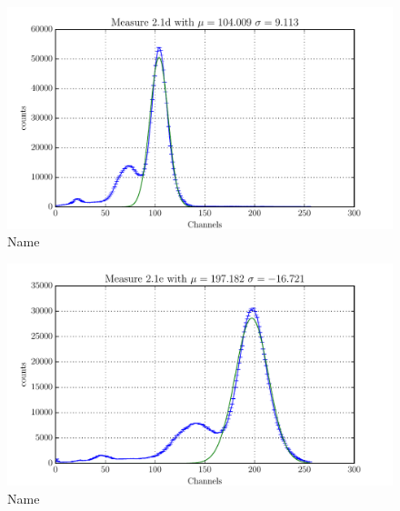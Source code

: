 \begin{figure}[htpb]
    \centering
    \includegraphics[width=0.8\linewidth]{analysis/figures/plot2_1d}
    \caption{Name}
    \label{fig:2_1a}
\end{figure}
\begin{figure}[htpb]
    \centering
    \includegraphics[width=0.8\linewidth]{analysis/figures/plot2_1e}
    \caption{Name}
    \label{fig:2_1a}
\end{figure}

